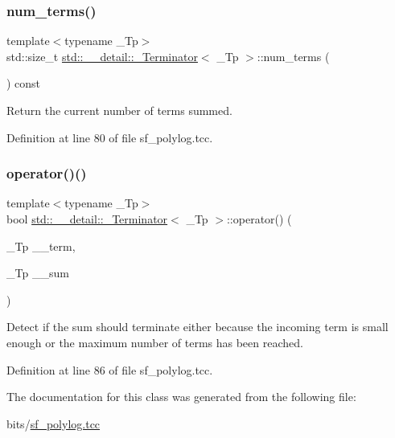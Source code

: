 \subsubsection{\texorpdfstring{num\+\_\+terms()}{num\_terms()}}
{\footnotesize\ttfamily template$<$typename \+\_\+\+Tp$>$ \\
std\+::size\+\_\+t \hyperlink{classstd_1_1____detail_1_1__Terminator}{std\+::\+\_\+\+\_\+detail\+::\+\_\+\+Terminator}$<$ \+\_\+\+Tp $>$\+::num\+\_\+terms (\begin{DoxyParamCaption}{ }\end{DoxyParamCaption}) const\hspace{0.3cm}{\ttfamily [inline]}}



Return the current number of terms summed. 



Definition at line 80 of file sf\+\_\+polylog.\+tcc.

\mbox{\label{classstd_1_1____detail_1_1__Terminator_a6c69c623075f36692ae86dd65b9c4a5c}} 
\subsubsection{\texorpdfstring{operator()()}{operator()()}}
{\footnotesize\ttfamily template$<$typename \+\_\+\+Tp$>$ \\
bool \hyperlink{classstd_1_1____detail_1_1__Terminator}{std\+::\+\_\+\+\_\+detail\+::\+\_\+\+Terminator}$<$ \+\_\+\+Tp $>$\+::operator() (\begin{DoxyParamCaption}\item[{\+\_\+\+Tp}]{\+\_\+\+\_\+term,  }\item[{\+\_\+\+Tp}]{\+\_\+\+\_\+sum }\end{DoxyParamCaption})\hspace{0.3cm}{\ttfamily [inline]}}



Detect if the sum should terminate either because the incoming term is small enough or the maximum number of terms has been reached. 



Definition at line 86 of file sf\+\_\+polylog.\+tcc.



The documentation for this class was generated from the following file\+:\begin{DoxyCompactItemize}
\item 
bits/\hyperlink{sf__polylog_8tcc}{sf\+\_\+polylog.\+tcc}\end{DoxyCompactItemize}
